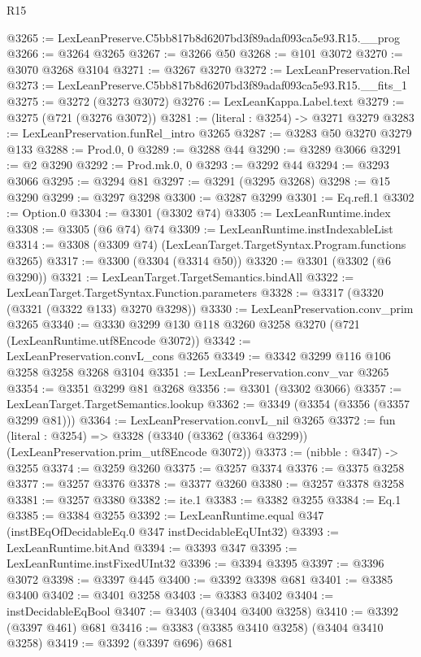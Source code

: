 \begin{lexlean}{R15}
\begin{coremodule}
@3265 := LexLeanPreserve.C5bb817b8d6207bd3f89adaf093ca5e93.R15.__prog
@3266 := @3264 @3265
@3267 := @3266 @50
@3268 := @101 @3072
@3270 := @3070 @3268 @3104
@3271 := @3267 @3270
@3272 := LexLeanPreservation.Rel
@3273 := LexLeanPreserve.C5bb817b8d6207bd3f89adaf093ca5e93.R15.__fits_1
@3275 := @3272 (@3273 @3072)
@3276 := LexLeanKappa.Label.text
@3279 := @3275 (@721 (@3276 @3072))
@3281 := (literal : @3254) -> @3271 @3279
@3283 := LexLeanPreservation.funRel_intro @3265
@3287 := @3283 @50 @3270 @3279 @133
@3288 := Prod.{0, 0}
@3289 := @3288 @44
@3290 := @3289 @3066
@3291 := @2 @3290
@3292 := Prod.mk.{0, 0}
@3293 := @3292 @44
@3294 := @3293 @3066
@3295 := @3294 @81
@3297 := @3291 (@3295 @3268)
@3298 := @15 @3290
@3299 := @3297 @3298
@3300 := @3287 @3299
@3301 := Eq.refl.{1}
@3302 := Option.{0}
@3304 := @3301 (@3302 @74)
@3305 := LexLeanRuntime.index
@3308 := @3305 (@6 @74) @74
@3309 := LexLeanRuntime.instIndexableList
@3314 := @3308 (@3309 @74) (LexLeanTarget.TargetSyntax.Program.functions @3265)
@3317 := @3300 (@3304 (@3314 @50))
@3320 := @3301 (@3302 (@6 @3290))
@3321 := LexLeanTarget.TargetSemantics.bindAll
@3322 := LexLeanTarget.TargetSyntax.Function.parameters
@3328 := @3317 (@3320 (@3321 (@3322 @133) @3270 @3298))
@3330 := LexLeanPreservation.conv_prim @3265
@3340 := @3330 @3299 @130 @118 @3260 @3258 @3270 (@721 (LexLeanRuntime.utf8Encode @3072))
@3342 := LexLeanPreservation.convL_cons @3265
@3349 := @3342 @3299 @116 @106 @3258 @3258 @3268 @3104
@3351 := LexLeanPreservation.conv_var @3265
@3354 := @3351 @3299 @81 @3268
@3356 := @3301 (@3302 @3066)
@3357 := LexLeanTarget.TargetSemantics.lookup
@3362 := @3349 (@3354 (@3356 (@3357 @3299 @81)))
@3364 := LexLeanPreservation.convL_nil @3265
@3372 := fun (literal : @3254) =>
  @3328 (@3340 (@3362 (@3364 @3299)) (LexLeanPreservation.prim_utf8Encode @3072))
@3373 := (nibble : @347) -> @3255
@3374 := @3259 @3260
@3375 := @3257 @3374
@3376 := @3375 @3258
@3377 := @3257 @3376
@3378 := @3377 @3260
@3380 := @3257 @3378 @3258
@3381 := @3257 @3380
@3382 := ite.{1}
@3383 := @3382 @3255
@3384 := Eq.{1}
@3385 := @3384 @3255
@3392 := LexLeanRuntime.equal @347 (instBEqOfDecidableEq.{0} @347 instDecidableEqUInt32)
@3393 := LexLeanRuntime.bitAnd
@3394 := @3393 @347
@3395 := LexLeanRuntime.instFixedUInt32
@3396 := @3394 @3395
@3397 := @3396 @3072
@3398 := @3397 @445
@3400 := @3392 @3398 @681
@3401 := @3385 @3400
@3402 := @3401 @3258
@3403 := @3383 @3402
@3404 := instDecidableEqBool
@3407 := @3403 (@3404 @3400 @3258)
@3410 := @3392 (@3397 @461) @681
@3416 := @3383 (@3385 @3410 @3258) (@3404 @3410 @3258)
@3419 := @3392 (@3397 @696) @681

\end{coremodule}
\end{lexlean}
